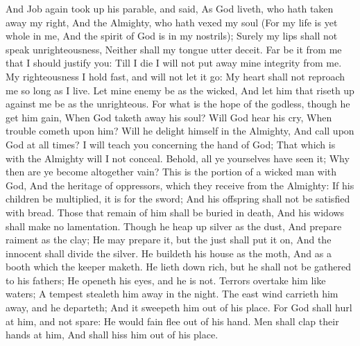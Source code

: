 And Job again took up his parable, and said,  As God liveth, who hath taken away my right, And the Almighty, who hath vexed my soul  (For my life is yet whole in me, And the spirit of God is in my nostrils);  Surely my lips shall not speak unrighteousness, Neither shall my tongue utter deceit.  Far be it from me that I should justify you: Till I die I will not put away mine integrity from me.  My righteousness I hold fast, and will not let it go: My heart shall not reproach me so long as I live.  Let mine enemy be as the wicked, And let him that riseth up against me be as the unrighteous.  For what is the hope of the godless, though he get him gain, When God taketh away his soul?  Will God hear his cry, When trouble cometh upon him?  Will he delight himself in the Almighty, And call upon God at all times?  I will teach you concerning the hand of God; That which is with the Almighty will I not conceal.  Behold, all ye yourselves have seen it; Why then are ye become altogether vain?  This is the portion of a wicked man with God, And the heritage of oppressors, which they receive from the Almighty:  If his children be multiplied, it is for the sword; And his offspring shall not be satisfied with bread.  Those that remain of him shall be buried in death, And his widows shall make no lamentation.  Though he heap up silver as the dust, And prepare raiment as the clay;  He may prepare it, but the just shall put it on, And the innocent shall divide the silver.  He buildeth his house as the moth, And as a booth which the keeper maketh.  He lieth down rich, but he shall not be gathered to his fathers; He openeth his eyes, and he is not.  Terrors overtake him like waters; A tempest stealeth him away in the night.  The east wind carrieth him away, and he departeth; And it sweepeth him out of his place.  For God shall hurl at him, and not spare: He would fain flee out of his hand.  Men shall clap their hands at him, And shall hiss him out of his place. 

